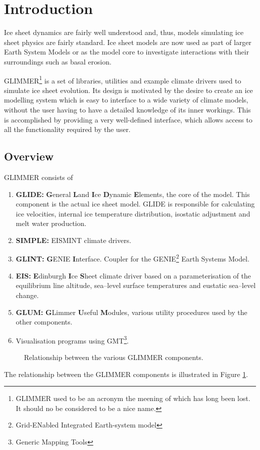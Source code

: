 \section{Introduction}
Ice sheet dynamics are fairly well understood and, thus, models simulating ice sheet physics are fairly standard. Ice sheet models are now used as part of larger Earth System Models or as the model core to investigate interactions with their surroundings such as basal erosion. 

GLIMMER\footnote{GLIMMER used to be an acronym the meening of which has long been lost. It should no be considered to be a nice name.} is a set of libraries, utilities and example climate drivers used to simulate ice sheet evolution. Its design is motivated by the desire to create an ice modelling system which is easy to interface to a wide variety of climate models, without the user having to have a detailed knowledge of its inner workings. This is accomplished by providing a very well-defined interface, which allows access to all the functionality required by the user.

\subsection{Overview}
GLIMMER consists of
\begin{enumerate}
\item {\bf GLIDE:} {\bf G}eneral {\bf L}and {\bf I}ce {\bf D}ynamic {\bf E}lements, the core of the model.  This component is the actual ice sheet model. GLIDE is responsible for calculating ice velocities, internal ice temperature distribution, isostatic adjustment and melt water production.
\item {\bf SIMPLE:} EISMINT climate drivers.
\item {\bf GLINT:} {\bf G}ENIE {\bf I}nterface. Coupler for the GENIE\footnote{Grid-ENabled Integrated Earth-system model} Earth Systems Model.
\item {\bf EIS:} {\bf E}dinburgh {\bf I}ce {\bf S}heet climate driver based on a parameterisation of the equilibrium line altitude, sea--level surface temperatures and eustatic sea--level change.
\item {\bf GLUM:} {\bf G}Limmer {\bf U}seful {\bf M}odules, various utility procedures used by the other components.
\item Visualisation programs using GMT\footnote{Generic Mapping Tools}.
\end{enumerate}
\begin{figure}[htbp]
  \centering
  \caption{Relationship between the various GLIMMER components.}
  \label{ug.fig.glimmer}
\end{figure}
The relationship between the GLIMMER components is illustrated in Figure \ref{ug.fig.glimmer}.

